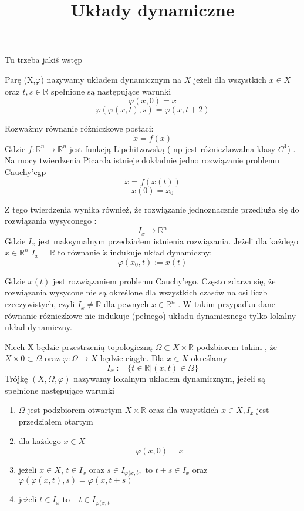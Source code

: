 \title{Układy dynamiczne}

Tu trzeba jakiś wstęp 

\begin{definition}
 \label{ukladDynamiczny}
 Parę (X,$\varphi$) nazywamy układem dynamicznym na $X$ jeżeli dla wszystkich  $ x \in X $  oraz $t,s \in \mathbb R $ spełnione są następujące warunki
    $$  \varphi(x,0) = x$$
    $$ \varphi(\varphi(x,t),s) = \varphi(x,t+2) $$



    



\end{definition}

    
Rozważmy równanie różniczkowe postaci:
	$$ \dot{x} = f(x) $$
Gdzie $ f : \mathbb R^n \to \mathbb R^n $ jest funkcją Lipchitzowską ( np jest różniczkowalna klasy $C^1$) . Na mocy twierdzenia Picarda istnieje dokładnie jedno rozwiązanie problemu Cauchy'egp
  $$ \dot{x} = f(x(t)) $$
  $$ x(0) = x_0 $$

Z tego twierdzenia wynika również, że rozwiązanie jednoznacznie przedłuża się do rozwiązania wysyconego :
 $$ I_x \to \mathbb R^n $$ 
 Gdzie $ I_x$ jest maksymalnym przedziałem istnienia rozwiązania. Jeżeli dla każdego  $x \in \mathbb R^n $ 
 $ I_x = \mathbb R $ to równanie  $ \dot{x} $ indukuje układ dynamiczny:
  $$
    \varphi(x_0,t) := x(t)
  $$
  
  Gdzie $x(t) $ jest rozwiązaniem problemu Cauchy'ego.
  Często zdarza się, że rozwiązania wysycone nie są określone dla wszystkich czasów na osi liczb rzeczywistych, czyli $ I_x \neq \mathbb R $ dla 
  pewnych $x \in \mathbb R^n $ . W takim przypadku dane równanie różniczkowe nie indukuje (pełnego) układu dynamicznego tylko 
  lokalny układ dynamiczny.

 \begin{definition}
  \label{lokalnyUkladDynamiczny}
  
    Niech X będzie przestrzenią topologiczną $ \Omega \subset X \times \mathbb R$ podzbiorem takim , że  $ X \times {0} \subset \Omega $ oraz 
    $ \varphi : \Omega \to X $ będzie ciągłe. Dla  $ x \in X $ określamy 
	$$ I_x := \{ t \in \mathbb R | (x,t) \in \Omega \}$$
    Trójkę $(X,\Omega,\varphi) $ nazywamy lokalnym układem dynamicznym, jeżeli są spełnione następujące warunki
    
    \begin{enumerate}
     \item $\Omega $ jest podzbiorem otwartym $ X\times \mathbb R $ oraz dla wszystkich $ x \in X , I_x $ jest przedziałem otartym
     \item dla każdego $x\in X$
	$$ \varphi(x,0) = x $$
     \item jeżeli $x \in X $, $ t \in I_x$ oraz $ s\in I_{\varphi(x,t},$ to $ t+s \in I_x $ oraz $ \varphi(\varphi(x,t),s) = \varphi(x,t+s) $
     \item jeżeli $ t\in I_x $ to $-t \in I_{\varphi(x,t} $
    \end{enumerate}

 \end{definition}

